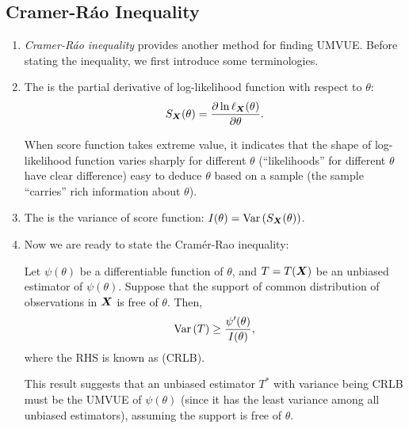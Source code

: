 \subsection{Cramer-R\'{a}o Inequality}
\begin{enumerate}
\item \emph{Cramer-R\'{a}o inequality} provides another method for finding
UMVUE. Before stating the inequality, we first introduce some terminologies.

\item The  is the partial derivative of log-likelihood
function with respect to \(\theta\):
\[
S_{\vb*{X}}(\theta)=\pdv{\ln\ell_{\vb*{X}}\qty(\theta)}{\theta}.
\]
\begin{note}
When score function takes extreme value, it indicates that the shape of
log-likelihood function varies sharply for different \(\theta\)
(``likelihoods'' for different \(\theta\) have clear difference)
 easy to deduce \(\theta\) based on a sample (the sample
``carries'' rich information about \(\theta\)).
\end{note}
\item The  is the variance of score function:
\(I(\theta)=\operatorname{Var}\qty(S_{\vb*{X}}(\theta))\).

\item Now we are ready to state the Cram\'{e}r-Rao inequality:
\begin{theorem}
\label{thm:cramer-rao-ineq}
Let \(\psi(\theta)\) be a differentiable function of \(\theta\), and
\(T=T(\vb*{X})\) be an unbiased estimator of \(\psi(\theta)\). Suppose that
the support of common distribution of observations in \(\vb*{X}\) is free of
\(\theta\). Then,
\[
\operatorname{Var}\qty(T)\ge\frac{\psi'(\theta)}{I(\theta)},
\]
where the RHS is known as  (CRLB).
\end{theorem}
\begin{note}
This result suggests that an unbiased estimator \(T^*\) with variance being
CRLB must be the UMVUE of \(\psi(\theta)\) (since it has the least variance
among all unbiased estimators), assuming the support is free of \(\theta\).
\end{note}
\end{enumerate}
